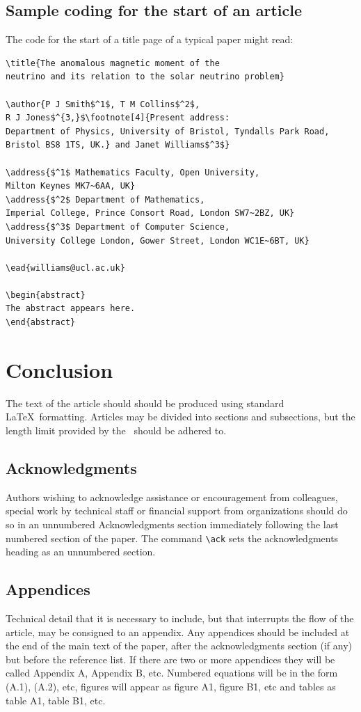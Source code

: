 \documentclass[a4paper]{jpconf}
\begin{document}
\subsection{Sample coding for the start of an article}
\label{startsample}
The code for the start of a title page of a typical paper might read:
\begin{verbatim}
\title{The anomalous magnetic moment of the 
neutrino and its relation to the solar neutrino problem}

\author{P J Smith$^1$, T M Collins$^2$, 
R J Jones$^{3,}$\footnote[4]{Present address:
Department of Physics, University of Bristol, Tyndalls Park Road, 
Bristol BS8 1TS, UK.} and Janet Williams$^3$}

\address{$^1$ Mathematics Faculty, Open University, 
Milton Keynes MK7~6AA, UK}
\address{$^2$ Department of Mathematics, 
Imperial College, Prince Consort Road, London SW7~2BZ, UK}
\address{$^3$ Department of Computer Science, 
University College London, Gower Street, London WC1E~6BT, UK}

\ead{williams@ucl.ac.uk}

\begin{abstract}
The abstract appears here.
\end{abstract}
\end{verbatim}

\section{Conclusion}
The text of the article should should be produced using standard \LaTeX\ formatting. Articles may be divided into sections and subsections, but the length limit provided by the \corg\ should be adhered to.

\subsection{Acknowledgments}
Authors wishing to acknowledge assistance or encouragement from
colleagues, special work by technical staff or financial support from
organizations should do so in an unnumbered Acknowledgments section
immediately following the last numbered section of the paper. The
command \verb"\ack" sets the acknowledgments heading as an unnumbered
section.

\subsection{Appendices}
Technical detail that it is necessary to include, but that interrupts
the flow of the article, may be consigned to an appendix.
Any appendices should be included at the end of the main text of the paper, after the acknowledgments section (if any) but before the reference list.
If there are two or more appendices they will be called Appendix A, Appendix B, etc.
Numbered equations will be in the form (A.1), (A.2), etc,
figures will appear as figure A1, figure B1, etc and tables as table A1,
table B1, etc.
\end{document}
